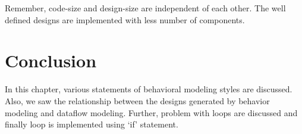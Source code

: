 \begin{noNumBox}
	Remember, code-size and design-size are independent of each other. The well defined designs are implemented with less number of components. 
\end{noNumBox}





\section{Conclusion}
In this chapter, various statements of behavioral modeling styles are discussed. Also, we saw the relationship between the designs generated by behavior modeling and dataflow modeling. Further, problem with loops are discussed and finally loop is implemented using `if' statement. 